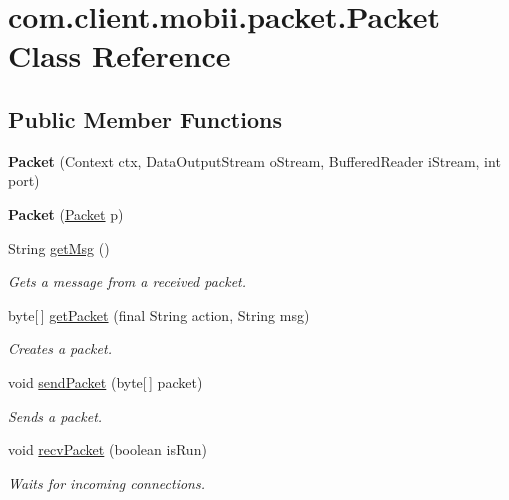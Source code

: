 \hypertarget{classcom_1_1client_1_1mobii_1_1packet_1_1_packet}{\section{com.\-client.\-mobii.\-packet.\-Packet Class Reference}
\label{classcom_1_1client_1_1mobii_1_1packet_1_1_packet}
}
\subsection*{Public Member Functions}
\begin{DoxyCompactItemize}
\item 
\hypertarget{classcom_1_1client_1_1mobii_1_1packet_1_1_packet_aabdbb2642dd37f8ad8b65f7f4c4cc782}{{\bfseries Packet} (Context ctx, Data\-Output\-Stream o\-Stream, Buffered\-Reader i\-Stream, int port)}\label{classcom_1_1client_1_1mobii_1_1packet_1_1_packet_aabdbb2642dd37f8ad8b65f7f4c4cc782}

\item 
\hypertarget{classcom_1_1client_1_1mobii_1_1packet_1_1_packet_a7898f6023b7fb83b2d2293327a444077}{{\bfseries Packet} (\hyperlink{classcom_1_1client_1_1mobii_1_1packet_1_1_packet}{Packet} p)}\label{classcom_1_1client_1_1mobii_1_1packet_1_1_packet_a7898f6023b7fb83b2d2293327a444077}

\item 
String \hyperlink{classcom_1_1client_1_1mobii_1_1packet_1_1_packet_ab4cb0c94df2fc340589f41dbca735073}{get\-Msg} ()
\begin{DoxyCompactList}\small\item\em Gets a message from a received packet. \end{DoxyCompactList}\item 
byte\mbox{[}$\,$\mbox{]} \hyperlink{classcom_1_1client_1_1mobii_1_1packet_1_1_packet_a30d210e2b7b8f4a2e43eef3d5c61b201}{get\-Packet} (final String action, String msg)
\begin{DoxyCompactList}\small\item\em Creates a packet. \end{DoxyCompactList}\item 
void \hyperlink{classcom_1_1client_1_1mobii_1_1packet_1_1_packet_a13135e046fa6e53b347ee1eb32f319ea}{send\-Packet} (byte\mbox{[}$\,$\mbox{]} packet)
\begin{DoxyCompactList}\small\item\em Sends a packet. \end{DoxyCompactList}\item 
void \hyperlink{classcom_1_1client_1_1mobii_1_1packet_1_1_packet_a29ff172dda03e55401abb3188df401de}{recv\-Packet} (boolean is\-Run)
\begin{DoxyCompactList}\small\item\em Waits for incoming connections. \end{DoxyCompactList}\end{DoxyCompactItemize}


